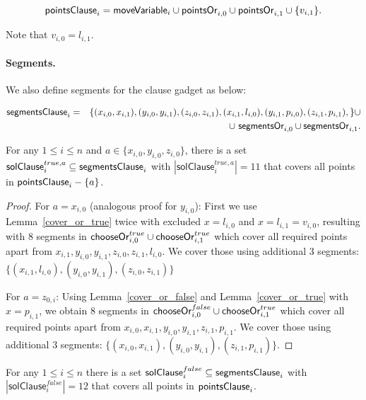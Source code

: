  $$\mathsf{pointsClause}_i = 
 \mathsf{moveVariable}_i \cup \mathsf{pointsOr}_{i,0}
 \cup \mathsf{pointsOr}_{i,1} \cup \{v_{i, 1} \}.
 $$
 
Note that $v_{i,0} = l_{i,1}$.

\paragraph{Segments.}
We also define segments for the clause gadget as below:

\begin{eqnarray*}
\mathsf{segmentsClause}_i & = & \{ (x_{i, 0}, x_{i, 1}),
(y_{i, 0}, y_{i, 1}),
(z_{i, 0}, z_{i, 1}),
(x_{i, 1}, l_{i, 0}),
(y_{i, 1}, p_{i, 0}),
(z_{i, 1}, p_{i, 1}),
\} \cup \\
& & \cup \ \mathsf{segmentsOr}_{i,0} \cup \mathsf{segmentsOr}_{i,1}.
\end{eqnarray*}

\newcommand{\segmentsClauseSolTrue}[1]{\mathsf{solClause}^{true,#1}}
\newcommand{\segmentsClauseSolFalse}{\mathsf{solClause}^{false}}

\begin{lemma}
\label{cover_clauses_solution_true}
For any $1 \le i \le n$ and $a \in \{ x_{i, 0}, y_{i, 0}, z_{i, 0}\}$,
there is a set $\segmentsClauseSolTrue{a}_i \subseteq \segmentsClause_i$
with $|\segmentsClauseSolTrue{a}_i| = 11$
that covers all points in $\mathsf{pointsClause}_i - \{a\}$.
\end{lemma}

\begin{proof}
For $a = x_{i, 0}$ (analogous proof for $y_{i, 0}$):
First we use Lemma~\ref{cover_or_true} twice with excluded $x = l_{i, 0}$ and
$x = l_{i, 1} = v_{i, 0}$,
resulting with 8 segments in $\mathsf{chooseOr}^{true}_{i,0} \cup \mathsf{chooseOr}^{true}_{i,1}$
which cover all required points apart from
$x_{i, 1}, y_{i, 0}, y_{i, 1}, z_{i, 0}, z_{i, 1}, l_{i, 0}$.
We cover those using additional 3 segments:
$\{ (x_{i, 1}, l_{i, 0}), (y_{i, 0}, y_{i, 1}),
(z_{i, 0}, z_{i, 1}) \}$

For $a = z_{0, i}$:
Using Lemma~\ref{cover_or_false} and Lemma~\ref{cover_or_true} with
$x = p_{i, 1}$,
we obtain 8 segments in $\mathsf{chooseOr}^{false}_{i,0} \cup \mathsf{chooseOr}^{true}_{i,1}$
which cover all required points apart from
$x_{i, 0}, x_{i, 1}, y_{i, 0}, y_{i, 1}, z_{i, 1}, p_{i, 1}$.
We cover those using additional 3 segments:
$\{ (x_{i, 0}, x_{i, 1}), (y_{i, 0}, y_{i, 1}),
(z_{i, 1}, p_{i, 1}) \}$.
\end{proof}

\begin{lemma}
\label{cover_clauses_solution_false}
For any $1 \le i \le n$ there is
a set $\segmentsClauseSolFalse_i \subseteq \segmentsClause_i$
with $|\segmentsClauseSolFalse_i| = 12$
that covers all points in $\mathsf{pointsClause}_i$.
\end{lemma}

